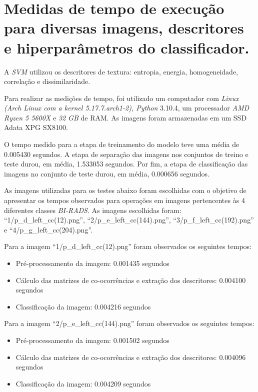 \section{Medidas de tempo de execução para diversas imagens, descritores e hiperparâmetros do
classificador.}

A \emph{SVM} utilizou os descritores de textura: entropia, energia, homogeneidade, correlação e dissimilaridade.

Para realizar as medições de tempo, foi utilizado um computador com \emph{Linux
(Arch Linux com a kernel 5.17.7.arch1-2), Python} 3.10.4, um processador \emph{AMD Ryzen 5 
5600X} e \emph{32 GB} de RAM. As imagens foram armazenadas em um SSD Adata XPG SX8100.

O tempo medido para a etapa de treinamento do modelo teve uma média de 0.005430 segundos.  
A etapa de separação das imagens nos conjuntos de treino e teste durou, em média, 1.533053 
segundos. Por fim, a etapa de classificação das imagens no conjunto de teste durou, em média, 0.000656 segundos.

As imagens utilizadas para os testes abaixo foram escolhidas com o objetivo de apresentar 
os tempos observados para operações em imagens pertencentes às 4 diferentes classes \emph{BI-RADS}. 
As imagens escolhidas foram: “1/p\_d\_left\_cc(12).png”, “2/p\_e\_left\_cc(144).png”, 
“3/p\_f\_left\_cc(192).png” e “4/p\_g\_left\_cc(204).png”.

\noindent
Para a imagem “1/p\_d\_left\_cc(12).png” foram observados os seguintes tempos:

\begin{itemize}
    \item Pré-processamento da imagem: 0.001435 segundos
    \item Cálculo das matrizes de co-ocorrências e extração dos descritores: 0.004100 segundos
    \item Classificação da imagem: 0.004216 segundos
\end{itemize}


\noindent
Para a imagem “2/p\_e\_left\_cc(144).png” foram observados os seguintes tempos:

\begin{itemize}
    \item Pré-processamento da imagem: 0.001502 segundos
    \item Cálculo das matrizes de co-ocorrências e extração dos descritores: 0.004096 segundos
    \item Classificação da imagem: 0.004209 segundos
\end{itemize}


